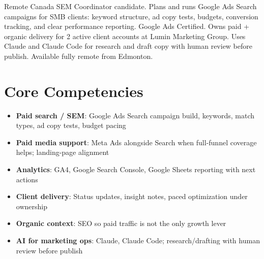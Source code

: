 \documentclass[11pt,a4paper,sans]{moderncv}
\begin{document}
\makecvtitle

\vspace{6pt}
\small{Remote Canada SEM Coordinator candidate. Plans and runs Google Ads Search campaigns for SMB clients: keyword structure, ad copy tests, budgets, conversion tracking, and clear performance reporting. Google Ads Certified. Owns paid + organic delivery for 2 active client accounts at Lumin Marketing Group. Uses Claude and Claude Code for research and draft copy with human review before publish. Available fully remote from Edmonton.}

\section{Core Competencies}
\vspace{1pt}
\begin{itemize}
\item \textbf{Paid search / SEM}: Google Ads Search campaign build, keywords, match types, ad copy tests, budget pacing
\item \textbf{Paid media support}: Meta Ads alongside Search when full-funnel coverage helps; landing-page alignment
\item \textbf{Analytics}: GA4, Google Search Console, Google Sheets reporting with next actions
\item \textbf{Client delivery}: Status updates, insight notes, paced optimization under ownership
\item \textbf{Organic context}: SEO so paid traffic is not the only growth lever
\item \textbf{AI for marketing ops}: Claude, Claude Code; research/drafting with human review before publish
\end{itemize}
\end{document}

